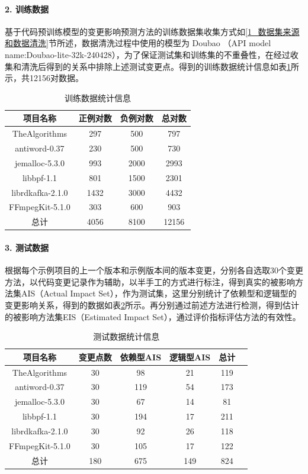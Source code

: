 \paragraph{2. 训练数据}
基于代码预训练模型的变更影响预测方法的训练数据集收集方式如\ref{1_数据集来源和数据清洗}节所述，数据清洗过程中使用的模型为 Doubao （API model name:Doubao-lite-32k-240428），为了保证测试集和训练集的不重叠性，在经过收集和清洗后得到的关系中排除上述测试变更点。得到的训练数据统计信息如表\ref{1_数据集统计信息}所示，共12156对数据。

\begin{table}[htbp]
\caption{训练数据统计信息}
\label{1_数据集统计信息}
\vspace{0.5em}\centering\wuhao
\begin{tabular}{cccc}
\toprule
项目名称 & 正例对数 & 负例对数 & 总对数 \\
\midrule
TheAlgorithms    & 297 & 500 & 797 \\
antiword-0.37    & 230 & 500  & 730 \\
jemalloc-5.3.0   & 993 & 2000 & 2993 \\
libbpf-1.1       & 801 & 1500 & 2301 \\
librdkafka-2.1.0 & 1432  & 3000 & 4432 \\
FFmpegKit-5.1.0  & 303 & 600 & 903 \\ 
总计              & 4056 & 8100 & 12156 \\
\bottomrule
\end{tabular}
\end{table}


\paragraph{3. 测试数据}
根据每个示例项目的上一个版本和示例版本间的版本变更，分别各自选取30个变更方法，以代码变更记录作为辅助，以半手工的方式进行标注，得到真实的被影响方法集AIS（Actual Impact Set），作为测试集，这里分别统计了依赖型和逻辑型的变更影响关系，得到的数据如表\ref{1_test_data_info}所示。再分别通过前述方法进行检测，得到估计的被影响方法集EIS（Estimated Impact Set），通过评价指标评估方法的有效性。

\begin{table}[htbp]
\caption{测试数据统计信息}
\label{1_test_data_info}
\vspace{0.5em}\centering\wuhao
\begin{tabular}{cccccc}
\toprule
项目名称  & 变更点数 & 依赖型AIS & 逻辑型AIS & 总计 \\
\midrule
TheAlgorithms  & 30 & 98 & 21 & 119\\
antiword-0.37  & 30 & 119 & 54 & 173 \\
jemalloc-5.3.0   & 30 & 67 & 14 & 81 \\
libbpf-1.1  & 30 & 194 & 17 & 211 \\
librdkafka-2.1.0  & 30 & 92 & 26 & 118\\
FFmpegKit-5.1.0  & 30 & 105 & 17 & 122\\
总计  & 180 & 675 & 149 & 824 \\
\bottomrule
\end{tabular}
\end{table}


